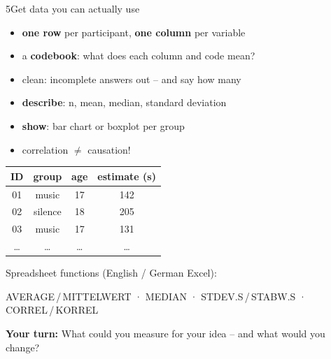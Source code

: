 \begin{wsbox}{5}{Get data you can actually use}
\begin{minipage}[t]{0.42\linewidth}
\begin{itemize}[itemsep=0.3mm]
\item \textbf{one row} per participant, \textbf{one column} per variable
\item a \textbf{codebook}: what does each column and code mean?
\item clean: incomplete answers out – and say how many
\item \textbf{describe}: n, mean, median, standard deviation
\item \textbf{show}: bar chart or boxplot per group
\item correlation $\neq$ causation!
\end{itemize}
\end{minipage}\hfill
\begin{minipage}[t]{0.55\linewidth}\vspace{0pt}
{\small
\renewcommand{\arraystretch}{1.12}
\begin{tabular}{@{}c c c c@{}}
\arrayrulecolor{rule}\toprule
\textbf{ID} & \textbf{group} & \textbf{age} & \textbf{estimate (s)}\\\midrule
01 & music & 17 & 142\\
02 & silence & 18 & 205\\
03 & music & 17 & 131\\
… & … & … & …\\\bottomrule
\end{tabular}}
\par\vspace{1.2mm}
{\small Spreadsheet functions (English / German Excel):\par
AVERAGE\,/\,MITTELWERT · MEDIAN · STDEV.S\,/\,STABW.S · CORREL\,/\,KORREL}
\end{minipage}
\par\vspace{2mm}
\textcolor{sec}{\small\textbf{Your turn:} What could you measure for your idea – and what would you change?}
\end{wsbox}

